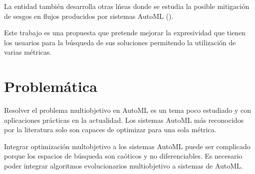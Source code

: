 La entidad tambi\'en desarrolla otras l\'neas donde se estudia la posible mitigaci\'on de sesgos en flujos producidos por sistemas AutoML (\cite{consuegra2022intelligent}).

Este trabajo es una propuesta que pretende mejorar la expresividad que tienen los usuarios para la b\'usqueda de sus soluciones permitendo la utilizaci\'on de varias m\'etricas.

\section*{Problem\'atica}
Resolver el problema multiobjetivo en AutoML es un tema poco estudiado y con aplicaciones pr\'acticas en la actualidad.
Los sistemas AutoML m\'as reconocidos por la literatura solo son capaces de optimizar para una sola m\'etrica. 

Integrar optimizaci\'on multobjetivo a los sistemas AutoML puede ser complicado porque los espacios de b\'usqueda  son ca\'oticos y no diferenciables. Es necesario poder integrar algoritmos evolucionarios multiobjetivo a sistemas de AutoML. %




